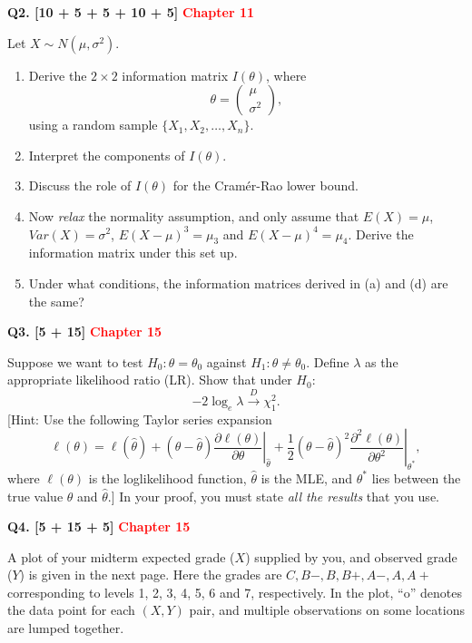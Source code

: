 \documentclass[11pt]{article}
\begin{document}
\bigskip

\textbf{Q2. [10 + 5 + 5 + 10 + 5]} \textbf{\textcolor{red}{Chapter 11}}

Let $X\sim N(\mu,\sigma^2)$.

\begin{enumerate}
\item[(a)] Derive the $2\times 2$ information matrix $I(\theta)$, where
\[
\theta=\begin{pmatrix}\mu\\\sigma^2\end{pmatrix},
\]
using a random sample $\{X_1,X_2,\ldots,X_n\}$.

\item[(b)] Interpret the components of $I(\theta)$.

\item[(c)] Discuss the role of $I(\theta)$ for the Cram\'er-Rao lower bound.

\item[(d)] Now \emph{relax} the normality assumption, and only assume that $E(X)=\mu$, $Var(X)=\sigma^2$, $E(X-\mu)^3=\mu_3$ and $E(X-\mu)^4=\mu_4$. Derive the information matrix under this set up.

\item[(e)] Under what conditions, the information matrices derived in (a) and (d) are the same?
\end{enumerate}

\bigskip

\textbf{Q3. [5 + 15]} \textbf{\textcolor{red}{Chapter 15}}

Suppose we want to test $H_0:\theta=\theta_0$ against $H_1:\theta\neq\theta_0$. Define $\lambda$ as the appropriate likelihood ratio (LR). Show that under $H_0$:
\[
-2\log_e\lambda\xrightarrow{D}\chi_1^2.
\]
[Hint: Use the following Taylor series expansion
\[
\ell(\theta)=\ell(\hat\theta)
+(\theta-\hat\theta)\left.\frac{\partial\ell(\theta)}{\partial\theta}\right|_{\hat\theta}
+\frac{1}{2}(\theta-\hat\theta)^2
\left.\frac{\partial^2\ell(\theta)}{\partial\theta^2}\right|_{\theta^*},
\]
where $\ell(\theta)$ is the loglikelihood function, $\hat\theta$ is the MLE, and $\theta^*$ lies between the true value $\theta$ and $\hat\theta$.] In your proof, you must state \emph{all the results} that you use.

\clearpage

\textbf{Q4. [5 + 15 + 5]} \textbf{\textcolor{red}{Chapter 15}}

A plot of your midterm expected grade ($X$) supplied by you, and observed grade ($Y$) is given in the next page. Here the grades are $C,B-,B,B+,A-,A,A+$ corresponding to levels 1, 2, 3, 4, 5, 6 and 7, respectively. In the plot, ``o'' denotes the data point for each $(X,Y)$ pair, and multiple observations on some locations are lumped together.
\end{document}
